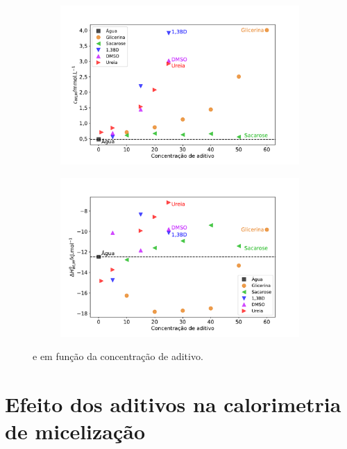 			\begin{figure}[h]
				\begin{subfigure}[t]{0.5\textwidth}
					\centering
					\includegraphics[width=\textwidth]{imagens/itc/Cwlm_por_conc}
					\caption{\cwlm}
					\label{fig:cwlm_por_conc}
				\end{subfigure} %
				\begin{subfigure}[t]{0.5\textwidth}
					\centering
					\includegraphics[width=\textwidth]{imagens/itc/DHwlm_por_conc}
					\caption{\DHwlm}
					\label{fig:dhwlm_por_conc}
				\end{subfigure}
				
				\caption{\cmc{} e \DHmic{} em função da concentração de aditivo.}
				\label{fig:cwlm_dhwlm_por_conc}
			\end{figure}
		
		\FloatBarrier
		
		\section{Efeito dos aditivos na calorimetria de micelização}
		
